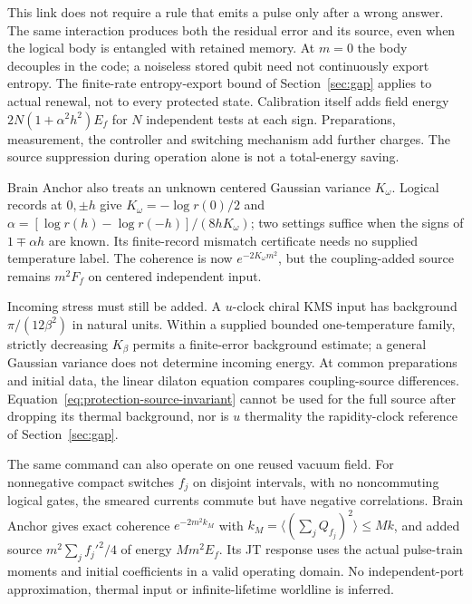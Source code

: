 This link does not require a rule that emits a pulse only after a wrong
answer. The same interaction produces both the residual error and its
source, even when the logical body is entangled with retained memory.
At $m=0$ the body decouples in the code; a noiseless stored qubit need
not continuously export entropy. The finite-rate entropy-export bound
of Section~\ref{sec:gap} applies to actual renewal, not to every protected
state. Calibration itself adds field energy
$2N(1+\alpha^2h^2)E_f$ for $N$ independent tests at each sign.
Preparations, measurement, the controller and switching mechanism add
further charges. The source suppression during operation alone is not
a total-energy saving.

Brain Anchor also treats an unknown centered Gaussian variance $K_\omega$. Logical records at $0,\pm h$ give
$K_\omega=-\log r(0)/2$ and
$\alpha=[\log r(h)-\log r(-h)]/(8hK_\omega)$; two settings suffice when the signs of $1\mp\alpha h$ are known. Its finite-record mismatch certificate needs no supplied temperature label. The coherence is now $e^{-2K_\omega m^2}$, but the coupling-added source remains $m^2F_f$ on centered independent input.

Incoming stress must still be added. A $u$-clock chiral KMS input has background $\pi/(12\beta^2)$ in natural units. Within a supplied bounded one-temperature family, strictly decreasing $K_\beta$ permits a finite-error background estimate; a general Gaussian variance does not determine incoming energy. At common preparations and initial data, the linear dilaton equation compares coupling-source differences. Equation~\eqref{eq:protection-source-invariant} cannot be used for the full source after dropping its thermal background, nor is $u$ thermality the rapidity-clock reference of Section~\ref{sec:gap}.

The same command can also operate on one reused vacuum field. For nonnegative compact switches $f_j$ on disjoint intervals, with no noncommuting logical gates, the smeared currents commute but have negative correlations. Brain Anchor gives exact coherence $e^{-2m^2k_M}$ with
$k_M=\langle(\sum_jQ_{f_j})^2\rangle\le Mk$, and added source $m^2\sum_jf_j'^2/4$ of energy $Mm^2E_f$. Its JT response uses the actual pulse-train moments and initial coefficients in a valid operating domain. No independent-port approximation, thermal input or infinite-lifetime worldline is inferred.

